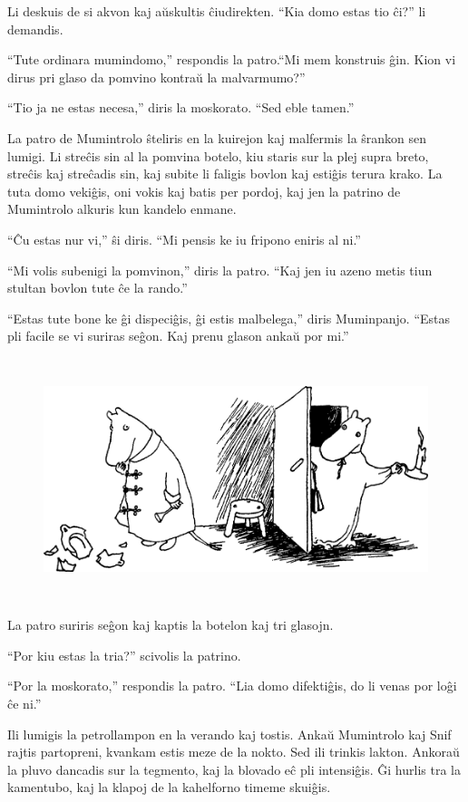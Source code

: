 Li deskuis de si akvon kaj aŭskultis ĉiudirekten. ``Kia domo estas tio ĉi?'' li demandis.

``Tute ordinara mumindomo,'' respondis la patro.``Mi mem konstruis ĝin. Kion vi dirus pri glaso da pomvino kontraŭ la malvarmumo?''

``Tio ja ne estas necesa,'' diris la moskorato. ``Sed eble tamen.''

La patro de Mumintrolo ŝteliris en la kuirejon kaj malfermis la ŝrankon sen lumigi. Li streĉis sin al la pomvina botelo, kiu staris sur la plej supra breto, streĉis kaj streĉadis sin, kaj subite li faligis bovlon kaj estiĝis terura krako. La tuta domo vekiĝis, oni vokis kaj batis per pordoj, kaj jen la patrino de Mumintrolo alkuris kun kandelo enmane.

``Ĉu estas nur vi,'' ŝi diris. ``Mi pensis ke iu fripono eniris al ni.''

``Mi volis subenigi la pomvinon,'' diris la patro. ``Kaj jen iu azeno metis tiun stultan bovlon tute ĉe la rando.''

``Estas tute bone ke ĝi dispeciĝis, ĝi estis malbelega,'' diris Muminpanjo. ``Estas pli facile se vi suriras seĝon. Kaj prenu glason ankaŭ por mi.''

\begin{figure}[htbp]
\centering
\includegraphics[width=414pt,height=200pt]{1-11.png}
\caption{}
\label{1-11}
\end{figure}

La patro suriris seĝon kaj kaptis la botelon kaj tri glasojn.

``Por kiu estas la tria?'' scivolis la patrino.

``Por la moskorato,'' respondis la patro. ``Lia domo difektiĝis, do li venas por loĝi ĉe ni.''

Ili lumigis la petrollampon en la verando kaj tostis. Ankaŭ Mumintrolo kaj Snif rajtis partopreni, kvankam estis meze de la nokto. Sed ili trinkis lakton. Ankoraŭ la pluvo dancadis sur la tegmento, kaj la blovado eĉ pli intensiĝis. Ĝi hurlis tra la kamentubo, kaj la klapoj de la kahelforno timeme skuiĝis.

